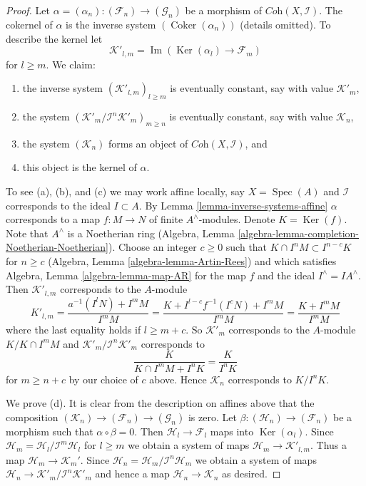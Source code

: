 \documentclass{stacks-project}
\theoremstyle{plain}
\theoremstyle{definition}
\theoremstyle{remark}
\numberwithin{equation}{subsection}
\def\Spec{\mathop{\mathrm{Spec}}}
\def\Ker{\mathop{\mathrm{Ker}}}
\def\Im{\mathop{\mathrm{Im}}}
\def\Coker{\mathop{\mathrm{Coker}}}
\begin{document}
\begin{proof}
Let $\alpha =(\alpha_n) : (\mathcal{F}_n) \to (\mathcal{G}_n)$ be a morphism of
$\textit{Coh}(X, \mathcal{I})$. The cokernel of $\alpha$ is the inverse system
$(\Coker(\alpha_n))$ (details omitted). To describe the kernel let
$$
\mathcal{K}'_{l, m} = \Im(\Ker(\alpha_l) \to \mathcal{F}_m)
$$
for $l \geq m$.
We claim:
\begin{enumerate}
\item[(a)] the inverse system $(\mathcal{K}'_{l, m})_{l \geq m}$ is
eventually constant, say with value $\mathcal{K}'_m$,
\item[(b)] the system $(\mathcal{K}'_m/\mathcal{I}^n\mathcal{K}'_m)_{m \geq n}$
is eventually constant, say with value $\mathcal{K}_n$,
\item[(c)] the system $(\mathcal{K}_n)$ forms an object of
$\textit{Coh}(X, \mathcal{I})$, and
\item[(d)] this object is the kernel of $\alpha$.
\end{enumerate}
To see (a), (b), and (c) we may work affine locally, say $X = \Spec(A)$
and $\mathcal{I}$ corresponds to the ideal $I \subset A$. By
Lemma \ref{lemma-inverse-systems-affine}
$\alpha$ corresponds to a map $f : M \to N$ of finite $A^\wedge$-modules.
Denote $K = \Ker(f)$. Note that $A^\wedge$ is a Noetherian
ring (Algebra, Lemma \ref{algebra-lemma-completion-Noetherian-Noetherian}).
Choose an integer $c \geq 0$ such that
$K \cap I^n M \subset I^{n - c}K$ for $n \geq c$
(Algebra, Lemma \ref{algebra-lemma-Artin-Rees})
and which satisfies Algebra, Lemma \ref{algebra-lemma-map-AR}
for the map $f$ and the ideal $I^\wedge = IA^\wedge$. Then
$\mathcal{K}'_{l, m}$ corresponds to the $A$-module
$$
K'_{l, m} = \frac{a^{-1}(I^lN) + I^mM}{I^mM} =
\frac{K + I^{l - c}f^{-1}(I^cN) + I^mM}{I^mM} =
\frac{K + I^mM}{I^mM}
$$
where the last equality holds if $l \geq m + c$. So $\mathcal{K}'_m$
corresponds to the $A$-module $K/K \cap I^mM$ and
$\mathcal{K}'_m/\mathcal{I}^n\mathcal{K}'_m$ corresponds to
$$
\frac{K}{K \cap I^mM + I^nK} = \frac{K}{I^nK}
$$
for $m \geq n + c$ by our choice of $c$ above. Hence $\mathcal{K}_n$
corresponds to $K/I^nK$.

\medskip\noindent
We prove (d). It is clear from the description on affines above that
the composition $(\mathcal{K}_n) \to (\mathcal{F}_n) \to (\mathcal{G}_n)$
is zero. Let $\beta : (\mathcal{H}_n) \to (\mathcal{F}_n)$
be a morphism such that $\alpha \circ \beta = 0$. Then
$\mathcal{H}_l \to \mathcal{F}_l$ maps into $\Ker(\alpha_l)$.
Since $\mathcal{H}_m = \mathcal{H}_l/\mathcal{I}^m\mathcal{H}_l$
for $l \geq m$ we obtain a system of maps
$\mathcal{H}_m \to \mathcal{K}'_{l, m}$. Thus a map
$\mathcal{H}_m \to \mathcal{K}_m'$. Since
$\mathcal{H}_n = \mathcal{H}_m/\mathcal{I}^n\mathcal{H}_m$ we obtain
a system of maps $\mathcal{H}_n \to \mathcal{K}'_m/\mathcal{I}^n\mathcal{K}'_m$
and hence a map $\mathcal{H}_n \to \mathcal{K}_n$ as desired.


\end{proof}
\end{document}

